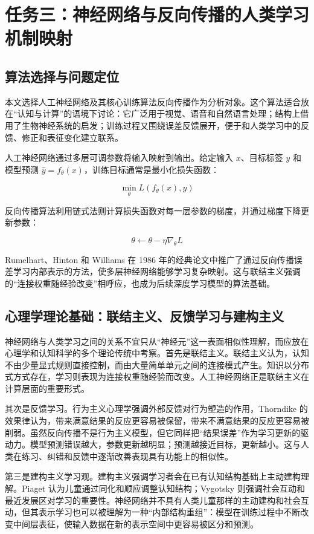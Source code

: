 \documentclass[UTF8,zihao=5,a4paper]{ctexart}
\begin{document}
\clearpage

\section{任务三：神经网络与反向传播的人类学习机制映射}

\subsection{算法选择与问题定位}

本文选择人工神经网络及其核心训练算法反向传播作为分析对象。这个算法适合放在“认知与计算”的语境下讨论：它广泛用于视觉、语音和自然语言处理；结构上借用了生物神经系统的启发；训练过程又围绕误差反馈展开，便于和人类学习中的反馈、修正和表征变化建立联系。

人工神经网络通过多层可调参数将输入映射到输出。给定输入 $x$、目标标签 $y$ 和模型预测 $\hat{y}=f_\theta(x)$，训练目标通常是最小化损失函数：

$$
\min_\theta L(f_\theta(x),y)
$$

反向传播算法利用链式法则计算损失函数对每一层参数的梯度，并通过梯度下降更新参数：

$$
\theta \leftarrow \theta - \eta \nabla_\theta L
$$

Rumelhart、Hinton 和 Williams 在 1986 年的经典论文中推广了通过反向传播误差学习内部表示的方法，使多层神经网络能够学习复杂映射\cite{rumelhart1986backprop}。这与联结主义强调的“连接权重随经验改变”相呼应，也成为后续深度学习模型的算法基础。

\subsection{心理学理论基础：联结主义、反馈学习与建构主义}

神经网络与人类学习之间的关系不宜只从“神经元”这一表面相似性理解，而应放在心理学和认知科学的多个理论传统中考察。首先是联结主义。联结主义认为，认知不由少量显式规则直接控制，而由大量简单单元之间的连接模式产生。知识以分布式方式存在，学习则表现为连接权重随经验而改变。人工神经网络正是联结主义在计算层面的重要形式。

其次是反馈学习。行为主义心理学强调外部反馈对行为塑造的作用，Thorndike 的效果律认为，带来满意结果的反应更容易被保留，带来不满意结果的反应更容易被削弱\cite{thorndike1911animal}。虽然反向传播不是行为主义模型，但它同样把“结果误差”作为学习更新的驱动力。模型预测错误越大，参数更新越明显；预测越接近目标，更新越小。这与人类在练习、纠错和反馈中逐渐改善表现具有功能上的相似性。

第三是建构主义学习观。建构主义强调学习者会在已有认知结构基础上主动建构理解。Piaget 认为儿童通过同化和顺应调整认知结构；Vygotsky 则强调社会互动和最近发展区对学习的重要性\cite{piaget1952origins,vygotsky1978mind}。神经网络并不具有人类儿童那样的主动建构和社会互动，但其表示学习也可以被理解为一种“内部结构重组”：模型在训练过程中不断改变中间层表征，使输入数据在新的表示空间中更容易被区分和预测。
\end{document}
